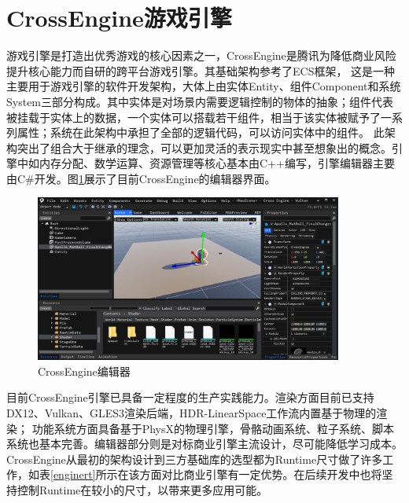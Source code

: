 \section{CrossEngine游戏引擎}
游戏引擎是打造出优秀游戏的核心因素之一，CrossEngine是腾讯为降低商业风险提升核心能力而自研的跨平台游戏引擎。其基础架构参考了ECS框架，
这是一种主要用于游戏引擎的软件开发架构，大体上由实体Entity、组件Component和系统System三部分构成\cite{ce1}。其中实体是对场景内需要逻辑控制的物体的抽象；组件代表被挂载于实体上的数据，一个实体可以搭载若干组件，相当于该实体被赋予了一系列属性；系统在此架构中承担了全部的逻辑代码，可以访问实体中的组件。
此架构突出了组合大于继承的理念，可以更加灵活的表示现实中甚至想象出的概念。引擎中如内存分配、数学运算、资源管理等核心基本由C++编写，引擎编辑器主要由C\#开发。图\ref{ceeditor}展示了目前CrossEngine的编辑器界面。
\begin{figure}[h!]
    \begin{center}
        \includegraphics[width=0.9\textwidth]{pictures/crossengine.png}
        \caption{CrossEngine编辑器}
        \label{ceeditor}
    \end{center}
\end{figure}
\par
目前CrossEngine引擎已具备一定程度的生产实践能力。渲染方面目前已支持DX12、Vulkan、GLES3渲染后端，HDR-LinearSpace工作流内置基于物理的渲染；
功能系统方面具备基于PhysX的物理引擎，骨骼动画系统、粒子系统、脚本系统也基本完善。编辑器部分则是对标商业引擎主流设计，尽可能降低学习成本。
CrossEngine从最初的架构设计到三方基础库的选型都为Runtime尺寸做了许多工作，如表\ref{enginert}所示在该方面对比商业引擎有一定优势。在后续开发中也将坚持控制Runtime在较小的尺寸，以带来更多应用可能。



